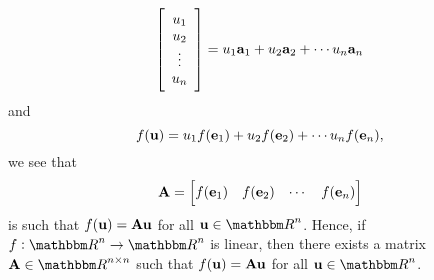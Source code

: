 \begin{solution}
\begin{enumerate}
$$                       \left[\begin{array}{c}u_1 \\ u_2 \\ \vdots \\ u_n\end{array}\right] 
                    = u_1 {\bf a}_1 + u_2 {\bf a}_2 + \cdots u_n {\bf a}_n$$
      and
          $$ f({\bf u}) = u_1 f({\bf e}_1) + u_2 f({\bf e}_2) + \cdots u_n f({\bf e}_n),$$
      we see that
          \[ {\bf A} = \Big[\begin{matrix}f({\bf e}_1) & f({\bf e}_2) & \cdots & f({\bf e}_n)\end{matrix}\Big]\]
is such that $f({\bf u})={\bf A}{\bf u}$ for all $\Bu\in\R^n$. Hence, if $f: \Rn \to \Rn$ is linear, then there exists a matrix $\BA\in\Rnn$ such that $f({\bf u})={\bf A}{\bf u}$ for all $\Bu\in\Rn$.
\end{enumerate}
\end{solution}